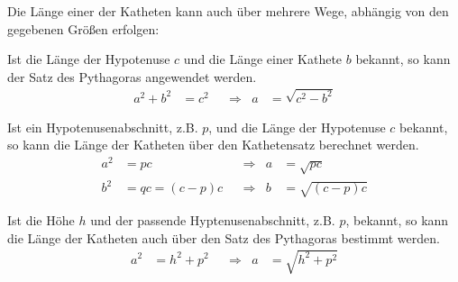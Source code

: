 \begin{folg}
 Die Länge einer der Katheten kann auch über mehrere Wege, abhängig von den gegebenen Größen erfolgen:
 
 Ist die Länge der Hypotenuse \(c\) und die Länge einer Kathete \(b\) bekannt, so kann der Satz des Pythagoras angewendet werden.
 \begin{align*}
  a^2 +b^2 &= c^2 & &\Rightarrow & a &=\sqrt{c^2-b^2}
 \end{align*}
 
 Ist ein Hypotenusenabschnitt, z.B. \(p\), und die Länge der Hypotenuse \(c\) bekannt, so kann die Länge der Katheten über den Kathetensatz berechnet werden.
 \begin{align*}
  a^2 &= pc &&\Rightarrow & a&=\sqrt{pc}\\
  b^2 &= qc = (c-p)c &&\Rightarrow & b&=\sqrt{(c-p)c}
 \end{align*}
 
 Ist die Höhe \(h\) und der passende Hyptenusenabschnitt, z.B. \(p\), bekannt, so kann die Länge der Katheten auch über den Satz des Pythagoras bestimmt werden.
 \begin{align*}
  a^2 &= h^2 + p^2 && \Rightarrow & a &= \sqrt{h^2+p^2}
 \end{align*}

\end{folg}

